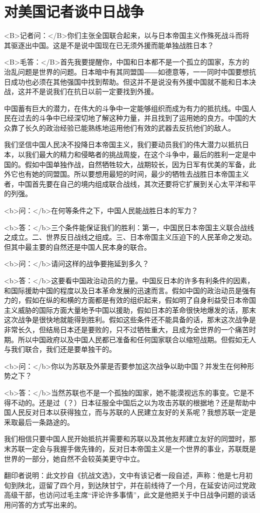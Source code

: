 \section[对美国记者谈中日战争（一九三七年）]{对美国记者谈中日战争}


<B>记者问：</B>你们主张全国联合起来，以与日本帝国主义作殊死战斗而将其驱逐出中国。这是不是说中国现在已无须外援而能单独战胜日本？

<B>毛答：</B>首先我要提醒你，中国和日本都不是一个孤立的国家，东方的治乱问题是世界的问题。日本暗中有其同盟国――如德意等，一一同时中国要想抗日成功也必须在其他强国中找到帮助。但这并不是说没有外援中国就不能和日本决战，这并不是说我们在抗日以前一定要找到外援。

中国蓄有巨大的潜力，在伟大的斗争中一定能够组织而成为有力的抵抗线。中国人民在过去的斗争中已经深切地了解这种力量，并且找到了运用她的良方。中国的大众靠了长久的政治经验已能熟练地运用他们有效的武器去反抗他们的敌人。

我们坚信中国人民决不投降日本帝国主义，我们要动员我们的伟大潜力以抵抗日本，以我们最大的精力和侵略者的挑战周旋，在这个斗争中，最后的胜利一定是中国的。假如中国单独作战，自然牺牲较大，战期较长，因为日军有优美的军备，此外它也有她的同盟国。所以要想用最短的时间，最少的牺牲去战胜日本帝国主义者，中国首先要在自己的境内组成联合战线，其次还要将它扩展到关心太平洋和平的列强。

<b>问：</b>在何等条件之下，中国人民能战胜日本的军力？

<b>答：</b>三个条件能保证我们的胜利：第一，中国民日本帝国主义联合战线之成立。二、世界反日战线之组成。三、日本帝国主义压迫下的人民革命之发动。但其中最主要的自然还是中国人民本身的联合。

<b>问：</b>请问这样的战争要拖延到多久？

<b>答：</b>这要看中国政治动员的力量。中国反日本的许多有利条件的因素，和国际援助中国的程度以及日本革命发展的迅速而言。假如中国的政治动员是强有力的，假如在纵的和横的方面都是有效的组织起来，假如明了自身利益受日本帝国主义威胁的国际方面大量地予中国以援助，假如日本的革命很快地爆发的话，那末这次战争是很快地就能得到胜利。假如这些条件还不能具备的话，那末这次战争是非常长久，但结局日本还是要败的，只不过牺牲重大，且成为全世界的一个痛苦时期。所以中国政府以及中国人民都已准备和任何国家联合以缩短战期。但假如无人与我们联合，我们还是要单独干的。

<b>问：</b>你以为苏联及外蒙是否要参加这次战争以助中国？并发生在何种形势之下？

<b>答：</b>当然苏联也不是一个孤独的国家，她不能漠视远东的事变。它是不得不动的。还是过（？）日本征服全中国后之以为攻击苏联的根据地？还是帮助中国人民反对日本以获得独立，而与苏联的人民建立友好的关系呢？我想苏联一定是釆取最后一条路途的。

我们相信只要中国人民开始抵抗并需要和苏联以及其他友邦建立友好的同盟时，那末苏联一定会与我握手做先锋的，反对日本帝国主义是一个世界的事业，苏联既是世界的一部分，她自然不会较英美更守中立。

翻印者说明：此文抄自《抗战文选》，文中有该记者一段自述，声称：他是七月初旬到陕北，逗留了四个月，到达陕甘宁，并在前线待了一个月，在延安访问过党政高级干部，也访问过毛主席“评论许多事情”，此文是他把关于中日战争问题的谈话用问答的方式写出来的。


